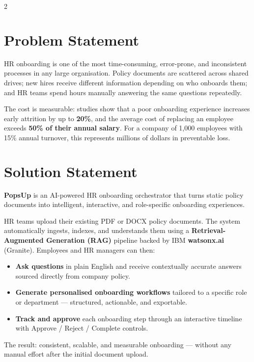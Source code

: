 \documentclass[10pt,a4paper]{article}
\begin{document}
\begin{multicols}{2}

\section{Problem Statement}

HR onboarding is one of the most time-consuming, error-prone, and inconsistent
processes in any large organisation. Policy documents are scattered across shared
drives; new hires receive different information depending on who onboards them;
and HR teams spend hours manually answering the same questions repeatedly.

The cost is measurable: studies show that a poor onboarding experience increases
early attrition by up to \textbf{20\%}, and the average cost of replacing an
employee exceeds \textbf{50\% of their annual salary}. For a company of 1,000
employees with 15\% annual turnover, this represents millions of dollars in
preventable loss.

\columnbreak

\section{Solution Statement}

\textbf{PopsUp} is an AI-powered HR onboarding orchestrator that turns static
policy documents into intelligent, interactive, and role-specific onboarding
experiences.

HR teams upload their existing PDF or DOCX policy documents. The system
automatically ingests, indexes, and understands them using a
\textbf{Retrieval-Augmented Generation (RAG)} pipeline backed by IBM
\textbf{watsonx.ai} (Granite). Employees and HR managers can then:

\begin{itemize}[leftmargin=1em,itemsep=1pt]
  \item \textbf{Ask questions} in plain English and receive contextually
        accurate answers sourced directly from company policy.
  \item \textbf{Generate personalised onboarding workflows} tailored to a
        specific role or department — structured, actionable, and exportable.
  \item \textbf{Track and approve} each onboarding step through an interactive
        timeline with Approve / Reject / Complete controls.
\end{itemize}

The result: consistent, scalable, and measurable onboarding — without any
manual effort after the initial document upload.

\end{multicols}
\end{document}
